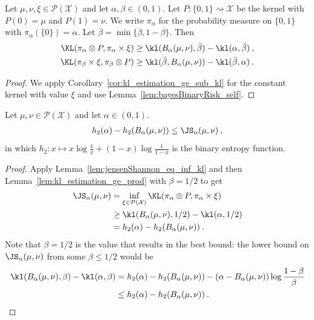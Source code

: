 \begin{lemma}
  \label{lem:kl_estimation_ge_prod}
  Let $\mu, \nu, \xi \in \mathcal P(\mathcal X)$ and let $\alpha, \beta \in (0, 1)$. Let $P : \{0,1\} \rightsquigarrow \mathcal X$ be the kernel with $P(0) = \mu$ and $P(1) = \nu$. We write $\pi_\alpha$ for the probability measure on $\{0,1\}$ with $\pi_\alpha(\{0\}) = \alpha$. Let $\bar{\beta} = \min\{\beta, 1 - \beta\}$.
  Then
  \begin{align*}
  \KL(\pi_\alpha \otimes P, \pi_\alpha \times \xi)
  &\ge \kl(B_\alpha(\mu, \nu), \bar{\beta}) - \kl(\alpha, \bar{\beta})
  \: , \\
  \KL(\pi_\beta \times \xi, \pi_\beta \otimes P)
  &\ge \kl(\bar{\beta}, B_\alpha(\mu, \nu)) - \kl(\bar{\beta}, \alpha)
  \: .
  \end{align*}
\end{lemma}

\begin{proof}%
{}
We apply Corollary~\ref{cor:kl_estimation_ge_sub_kl} for the constant kernel with value $\xi$ and use Lemma~\ref{lem:bayesBinaryRisk_self}.
\end{proof}


\begin{theorem}
  \label{thm:sub_bayesBinaryRisk_le_jensenShannon}
  Let $\mu, \nu \in \mathcal P(\mathcal X)$ and let $\alpha \in (0, 1)$.
  \begin{align*}
  h_2(\alpha) - h_2(B_\alpha(\mu, \nu)) \le \JS_\alpha(\mu, \nu) \: ,
  \end{align*}
  in which $h_2: x \mapsto x\log\frac{1}{x} + (1 - x)\log\frac{1}{1 - x}$ is the binary entropy function.
\end{theorem}

\begin{proof}%
{}
Apply Lemma~\ref{lem:jensenShannon_eq_inf_kl} and then Lemma~\ref{lem:kl_estimation_ge_prod} with $\beta = 1/2$ to get
\begin{align*}
\JS_\alpha(\mu, \nu)
&= \inf_{\xi \in \mathcal P(\mathcal X)}\KL(\pi_\alpha \otimes P, \pi_\alpha \times \xi)
\\
&\ge \kl(B_\alpha(\mu, \nu), 1/2) - \kl(\alpha, 1/2)
\\
&= h_2(\alpha) - h_2(B_\alpha(\mu, \nu)) \: .
\end{align*}
Note that $\beta = 1/2$ is the value that results in the best bound: the lower bound on $\JS_\alpha(\mu, \nu)$ from some $\beta \le 1/2$ would be
\begin{align*}
\kl(B_\alpha(\mu, \nu), \beta) - \kl(\alpha, \beta)
&= h_2(\alpha) - h_2(B_\alpha(\mu, \nu)) - (\alpha - B_\alpha(\mu, \nu)) \log \frac{1 - \beta}{\beta}
\\
&\le h_2(\alpha) - h_2(B_\alpha(\mu, \nu)) \: .
\end{align*}

\end{proof}


